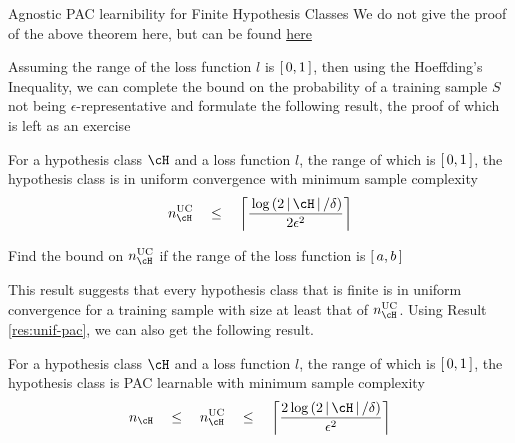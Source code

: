 \documentclass{article}
\begin{document}
\begin{ssection}[4]{Agnostic PAC learnibility for Finite Hypothesis Classes}
	We do not give the proof of the above theorem here, but can be found \href{https://en.wikipedia.org/wiki/Hoeffding\%27s\_inequality\#Proof}{here} \br

	Assuming the range of the loss function $l$ is $\left[\,{0, 1}\,\right]$, then using the Hoeffding's Inequality, we can complete the bound on the probability of a training sample $S$ not being $\epsilon$-representative and formulate the following result, the proof of which is left as an exercise

	\begin{result}
		For a hypothesis class $\cH$ and a loss function $l$, the range of which is $\left[\,{0, 1}\,\right]$, the hypothesis class is in uniform convergence with minimum sample complexity
		\begin{equation}
			n_\cH^{\text{UC}}	\qle	\ceil{\frac{\log{2 \abs{\cH} / \delta}}{2 \epsilon^2}}
		\end{equation}
	\end{result}

	\begin{exercise}
		Find the bound on $n_\cH^{\text{UC}}$ if the range of the loss function is $\left[\,{a, b}\,\right]$
	\end{exercise}

	This result suggests that every hypothesis class that is finite is in uniform convergence for a training sample with size at least that of $n_\cH^{\text{UC}}$. Using Result \ref{res:unif-pac}, we can also get the following result.

	\begin{result}
		For a hypothesis class $\cH$ and a loss function $l$, the range of which is $\left[\,{0, 1}\,\right]$, the hypothesis class is PAC learnable with minimum sample complexity
		\begin{equation}
			n_\cH	\qle	n_\cH^{\text{UC}}	\qle	\ceil{\frac{2 \log{2 \abs{\cH} / \delta}}{\epsilon^2}}
		\end{equation}
	\end{result}

\end{ssection}
\end{document}
